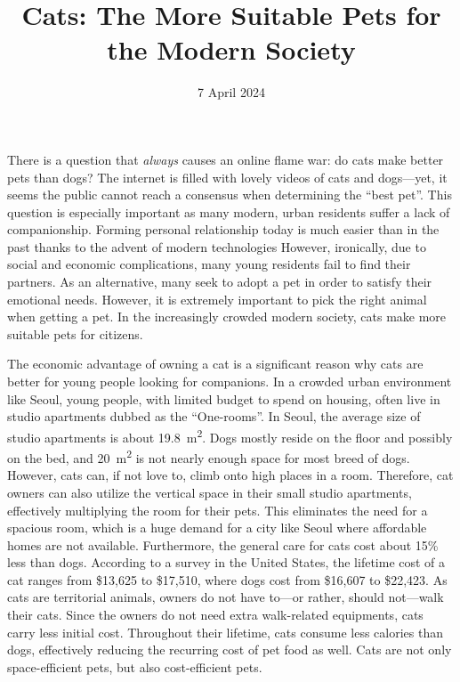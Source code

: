 \documentclass{mla}
\date{7 April 2024}
\title{Cats: The More Suitable Pets for the Modern Society}
\begin{document}
There is a question that \textit{always} causes an online flame war: do cats make better pets than dogs?
The internet is filled with lovely videos of cats and dogs---yet, it seems the public cannot reach a consensus when determining the ``best pet''.
This question is especially important as many modern, urban residents suffer a lack of companionship.
Forming personal relationship today is much easier than in the past thanks to the advent of modern technologies
However, ironically, due to social and economic complications, many young residents fail to find their partners. 
As an alternative, many seek to adopt a pet in order to satisfy their emotional needs.
However, it is extremely important to pick the right animal when getting a pet.
In the increasingly crowded modern society, cats make more suitable pets for citizens.

The economic advantage of owning a cat is a significant reason why cats are better for young people looking for companions.
In a crowded urban environment like Seoul, young people, with limited budget to spend on housing, often live in studio apartments dubbed as the ``One-rooms''.
In Seoul, the average size of studio apartments is about \SI{19.8}{\square\m}.
Dogs mostly reside on the floor and possibly on the bed, and \SI{20}{\square\m} is not nearly enough space for most breed of dogs.
However, cats can, if not love to, climb onto high places in a room.
Therefore, cat owners can also utilize the vertical space in their small studio apartments, effectively multiplying the room for their pets.
This eliminates the need for a spacious room, which is a huge demand for a city like Seoul where affordable homes are not available.
Furthermore, the general care for cats cost about 15\% less than dogs.
According to a survey in the United States, the lifetime cost of a cat ranges from \$13,625 to \$17,510, where dogs cost from \$16,607 to \$22,423.
As cats are territorial animals, owners do not have to---or rather, should not---walk their cats.
Since the owners do not need extra walk-related equipments, cats carry less initial cost.
Throughout their lifetime, cats consume less calories than dogs, effectively reducing the recurring cost of pet food as well.
Cats are not only space-efficient pets, but also cost-efficient pets.
\end{document}

